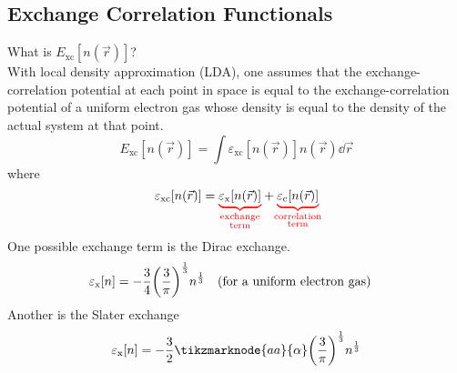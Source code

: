 \documentclass[12pt,a4paper,titlepage]{article}
\newcommand{\trm}[1]{\textrm{#1}} %
\begin{document}
\subsection{Exchange Correlation Functionals}
What is $E_{\trm{xc}}[n(\vec{r})]$?\\

With local density approximation (LDA), one assumes that the exchange-correlation potential at each point in space is equal to the exchange-correlation potential of a uniform electron gas whose density is equal to the density of the actual system at that point.
\begin{equation}
E_{\trm{xc}}[n(\vec{r})]=\int\varepsilon_{\trm{xc}}[n(\vec{r})]n(\vec{r})\dd{\vec{r}}
\end{equation}
where
\begin{equation}
\varepsilon_{\trm{xc}}[n(\vec{r})]={\color{red}\underbrace{\color{black}\varepsilon_{\trm{x}}[n(\vec{r})]}_{\mathclap{\substack{\trm{exchange}\\\trm{term}}}}}+{\color{red}\underbrace{\color{black}\varepsilon_{\trm{c}}[n(\vec{r})]}_{\mathclap{\substack{\trm{correlation}\\\trm{term}}}}}
\end{equation}
One possible exchange term is the Dirac exchange.
\begin{equation}
\varepsilon_{\trm{x}}[n]=-\frac{3}{4}\qty(\frac{3}{\pi})^{\frac{1}{3}}n^{\frac{1}{3}}\qq{(for a uniform electron gas)}
\end{equation}
Another is the Slater exchange
\begin{equation}
\varepsilon_{\trm{x}}[n]=-\frac{3}{2}\tikzmarknode{aa}{\alpha}\qty(\frac{3}{\pi})^{\frac{1}{3}}n^{\frac{1}{3}}
\end{equation}
\end{document}

